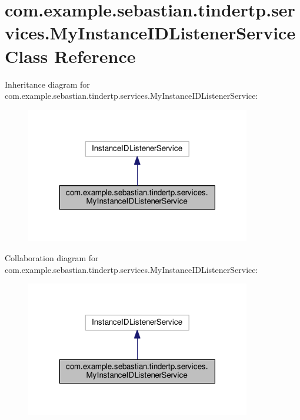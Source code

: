 \hypertarget{classcom_1_1example_1_1sebastian_1_1tindertp_1_1services_1_1MyInstanceIDListenerService}{}\section{com.\+example.\+sebastian.\+tindertp.\+services.\+My\+Instance\+I\+D\+Listener\+Service Class Reference}
\label{classcom_1_1example_1_1sebastian_1_1tindertp_1_1services_1_1MyInstanceIDListenerService}


Inheritance diagram for com.\+example.\+sebastian.\+tindertp.\+services.\+My\+Instance\+I\+D\+Listener\+Service\+:\nopagebreak
\begin{figure}[H]
\begin{center}
\leavevmode
\includegraphics[width=278pt]{classcom_1_1example_1_1sebastian_1_1tindertp_1_1services_1_1MyInstanceIDListenerService__inherit__graph}
\end{center}
\end{figure}


Collaboration diagram for com.\+example.\+sebastian.\+tindertp.\+services.\+My\+Instance\+I\+D\+Listener\+Service\+:\nopagebreak
\begin{figure}[H]
\begin{center}
\leavevmode
\includegraphics[width=278pt]{classcom_1_1example_1_1sebastian_1_1tindertp_1_1services_1_1MyInstanceIDListenerService__coll__graph}
\end{center}
\end{figure}
